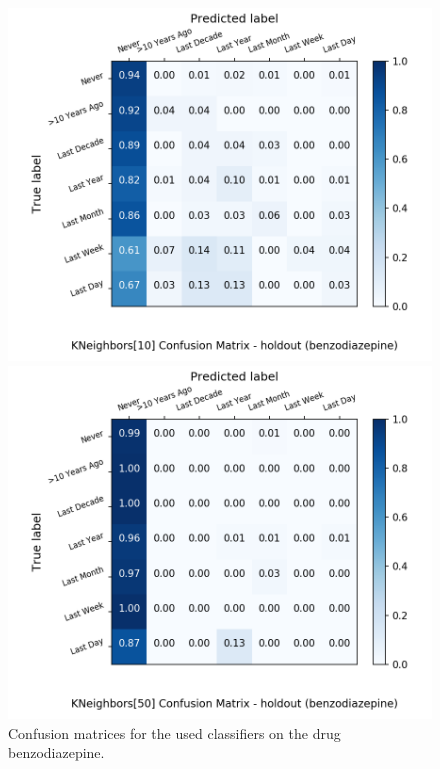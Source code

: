 \begin{figure}[H]
\begin{minipage}[b]{0.32\textwidth}
		\includegraphics[width=1.1\textwidth]{Plots/benzodiazepine_KNeighbors_10_balance_False_holdout.png}
  \end{minipage}
	\begin{minipage}[b]{0.32\textwidth}
		\includegraphics[width=1.1\textwidth]{Plots/benzodiazepine_KNeighbors_50_balance_False_holdout.png}
  \end{minipage}
	\caption{Confusion matrices for the used classifiers on the drug benzodiazepine.}
\end{figure}

